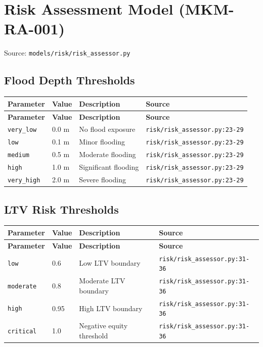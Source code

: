 \documentclass[11pt,a4paper]{article}
\begin{document}
\clearpage

\section{Risk Assessment Model (MKM-RA-001)}

Source: \texttt{models/risk/risk\_assessor.py}

\subsection{Flood Depth Thresholds}

\begin{longtable}{p{4cm}p{4cm}p{5.5cm}p{3.5cm}}
    \toprule
    \textbf{Parameter} & \textbf{Value} & \textbf{Description} & \textbf{Source} \\
    \midrule
    \endfirsthead
    \toprule
    \textbf{Parameter} & \textbf{Value} & \textbf{Description} & \textbf{Source} \\
    \midrule
    \endhead
    \bottomrule
    \endfoot
    \texttt{very\_low} & 0.0 m & No flood exposure & {\scriptsize \texttt{risk/risk\_assessor.py:23-29}} \\
    \texttt{low} & 0.1 m & Minor flooding & {\scriptsize \texttt{risk/risk\_assessor.py:23-29}} \\
    \texttt{medium} & 0.5 m & Moderate flooding & {\scriptsize \texttt{risk/risk\_assessor.py:23-29}} \\
    \texttt{high} & 1.0 m & Significant flooding & {\scriptsize \texttt{risk/risk\_assessor.py:23-29}} \\
    \texttt{very\_high} & 2.0 m & Severe flooding & {\scriptsize \texttt{risk/risk\_assessor.py:23-29}} \\
\end{longtable}

\subsection{LTV Risk Thresholds}

\begin{longtable}{p{4cm}p{4cm}p{5.5cm}p{3.5cm}}
    \toprule
    \textbf{Parameter} & \textbf{Value} & \textbf{Description} & \textbf{Source} \\
    \midrule
    \endfirsthead
    \toprule
    \textbf{Parameter} & \textbf{Value} & \textbf{Description} & \textbf{Source} \\
    \midrule
    \endhead
    \bottomrule
    \endfoot
    \texttt{low} & 0.6 & Low LTV boundary & {\scriptsize \texttt{risk/risk\_assessor.py:31-36}} \\
    \texttt{moderate} & 0.8 & Moderate LTV boundary & {\scriptsize \texttt{risk/risk\_assessor.py:31-36}} \\
    \texttt{high} & 0.95 & High LTV boundary & {\scriptsize \texttt{risk/risk\_assessor.py:31-36}} \\
    \texttt{critical} & 1.0 & Negative equity threshold & {\scriptsize \texttt{risk/risk\_assessor.py:31-36}} \\
\end{longtable}
\end{document}
